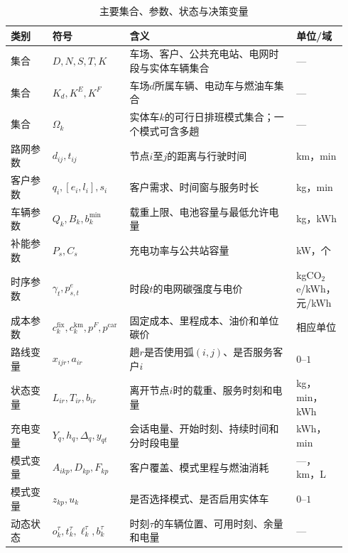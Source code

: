 \documentclass{setp-new}
\begin{document}
\begin{table}[htbp]
  \centering
  \caption{主要集合、参数、状态与决策变量}
  \label{tab:symbols}
  \small
  \begin{tabular}{p{0.12\linewidth}p{0.21\linewidth}p{0.48\linewidth}p{0.13\linewidth}}
    \toprule
    类别 & 符号 & 含义 & 单位/域\\
    \midrule
    集合 & $D,N,S,T,K$ & 车场、客户、公共充电站、电网时段与实体车辆集合 & ---\\
    集合 & $K_d,K^E,K^F$ & 车场$d$所属车辆、电动车与燃油车集合 & ---\\
    集合 & $\Omega_k$ & 实体车$k$的可行日排班模式集合；一个模式可含多趟 & ---\\
    路网参数 & $d_{ij},t_{ij}$ & 节点$i$至$j$的距离与行驶时间 & km，min\\
    客户参数 & $q_i,[e_i,l_i],s_i$ & 客户需求、时间窗与服务时长 & kg，min\\
    车辆参数 & $Q_k,B_k,b_k^{\min}$ & 载重上限、电池容量与最低允许电量 & kg，kWh\\
    补能参数 & $P_s,C_s$ & 充电功率与公共站容量 & kW，个\\
    时序参数 & $\gamma_t,p^e_{s,t}$ & 时段$t$的电网碳强度与电价 & kgCO$_2$e/kWh，元/kWh\\
    成本参数 & $c_k^{\mathrm{fix}},c_k^{\mathrm{km}},p^F,p^{\mathrm{car}}$ & 固定成本、里程成本、油价和单位碳价 & 相应单位\\
    路线变量 & $x_{ijr},a_{ir}$ & 趟$r$是否使用弧$(i,j)$、是否服务客户$i$ & $0$--$1$\\
    状态变量 & $L_{ir},T_{ir},b_{ir}$ & 离开节点$i$时的载重、服务时刻和电量 & kg，min，kWh\\
    充电变量 & $Y_q,h_q,\Delta_q,y_{qt}$ & 会话电量、开始时刻、持续时间和分时段电量 & kWh，min\\
    模式变量 & $A_{ikp},D_{kp},F_{kp}$ & 客户覆盖、模式里程与燃油消耗 & ---，km，L\\
    模式变量 & $z_{kp},u_k$ & 是否选择模式、是否启用实体车 & $0$--$1$\\
    动态状态 & $o_k^\tau,t_k^\tau,\ell_k^\tau,b_k^\tau$ & 时刻$\tau$的车辆位置、可用时刻、余量和电量 & ---\\
    \bottomrule
  \end{tabular}
\end{table}


\end{document}
